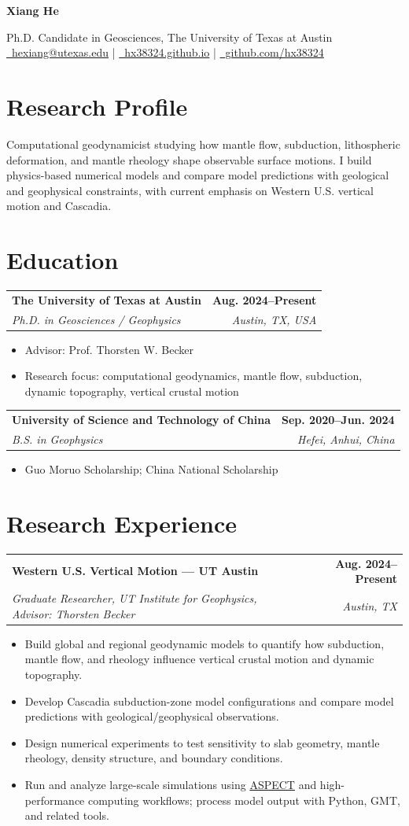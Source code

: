 \documentclass[10pt,letterpaper]{article}
\makeatletter
\newcommand{\cvname}[1]{\begin{center}{\Huge\bfseries #1}\end{center}}
\newcommand{\cvcontact}[1]{\begin{center}\small #1\end{center}}
\newcommand{\cventry}[4]{%
  \begin{tabularx}{\textwidth}{@{}Xr@{}}
    \textbf{#1} & \textbf{#2} \\
    \textit{#3} & \textit{#4}
  \end{tabularx}\vspace{0.15em}
}
\makeatother
\begin{document}
\cvname{Xiang He}
\cvcontact{
  Ph.D. Candidate in Geosciences, The University of Texas at Austin\\[0.15em]
  \href{mailto:hexiang@utexas.edu}{\faEnvelope\ hexiang@utexas.edu}
  \quad | \quad
  \href{https://hx38324.github.io/}{\faGlobe\ hx38324.github.io}
  \quad | \quad
  \href{https://github.com/hx38324}{\faGithub\ github.com/hx38324}
}

\section{Research Profile}
Computational geodynamicist studying how mantle flow, subduction, lithospheric deformation, and mantle rheology shape observable surface motions. I build physics-based numerical models and compare model predictions with geological and geophysical constraints, with current emphasis on Western U.S. vertical motion and Cascadia.

\section{Education}
\cventry{The University of Texas at Austin}{Aug. 2024--Present}
{Ph.D. in Geosciences / Geophysics}{Austin, TX, USA}
\begin{itemize}
  \item Advisor: Prof. Thorsten W. Becker
  \item Research focus: computational geodynamics, mantle flow, subduction, dynamic topography, vertical crustal motion
\end{itemize}

\cventry{University of Science and Technology of China}{Sep. 2020--Jun. 2024}
{B.S. in Geophysics}{Hefei, Anhui, China}
\begin{itemize}
  \item Guo Moruo Scholarship; China National Scholarship
\end{itemize}

\section{Research Experience}
\cventry{Western U.S. Vertical Motion — UT Austin}{Aug. 2024--Present}
{Graduate Researcher, UT Institute for Geophysics, Advisor: Thorsten Becker}{Austin, TX}
\begin{itemize}
  \item Build global and regional geodynamic models to quantify how subduction, mantle flow, and rheology influence vertical crustal motion and dynamic topography.
  \item Develop Cascadia subduction-zone model configurations and compare model predictions with geological/geophysical observations.
  \item Design numerical experiments to test sensitivity to slab geometry, mantle rheology, density structure, and boundary conditions.
  \item Run and analyze large-scale simulations using \href{https://aspect.geodynamics.org/}{ASPECT} and high-performance computing workflows; process model output with Python, GMT, and related tools.
\end{itemize}
\end{document}
